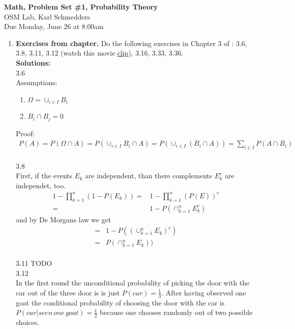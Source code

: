 \documentclass[letterpaper,12pt]{article}
\theoremstyle{definition}
\begin{document}
\begin{flushleft}
   \textbf{\large{Math, Problem Set \#1, Probability Theory}} \\[5pt]
   OSM Lab, Karl Schmedders \\[5pt]
   Due Monday, June 26 at 8:00am
\end{flushleft}

\vspace{5mm}

\begin{enumerate}
	\item {\bf Exercises from chapter.} Do the following exercises in Chapter 3 of \citet{HJ17}: 3.6, 3.8, 3.11, 3.12 (watch this movie \href{https://www.youtube.com/watch?v=Zr_xWfThjJ0}{clip}), 3.16, 3.33, 3.36. \\
	
	\textbf{Solutions:}\\
	3.6\\
 Assumptions: 
\begin{enumerate}
\item  $\Omega = \cup_{i\in I} B_i$ 
\item $B_i\cap B_j = 0$
\end{enumerate}  
Proof: 
\begin{align*}
P(A) =  P(\Omega \cap A) = P(\cup_{i\in I} B_i \cap A)
 = P(\cup_{i \in I} (B_i \cap A)) = \sum_{i \in I} P(A \cap B_i)
\end{align*} \\
3.8 \\ 
First, if the events $E_k$ are independent, than there complements $E_k^c$ are independet, too.
\begin{align*}
1-\prod_{k=1}^{n}(1 - P(E_k)) =& 1 - \prod_{k=1}^{n}\left( P(E) \right)^c \\
=& 1 -P(\cap^n_{k=1} E^c_k) 
\end{align*}
and by De Morgans law we get
\begin{align*}
=& 1 - P((\cup^n_{k=1} E_k)^c) \\
=& P(\cap^n_{k=1} E_k)) 
\end{align*} \\
3.11 TODO\\
3.12 \\
In the first round the unconditional  probability of picking the door with the car out of the three door is is just $P(car) = \frac{1}{3}$. After having observed one goat the conditional probability of choosing the door with the car is $P(car|seen\, one\, goat) = \frac{1}{2}$ because one chooses randomly out of two possible choices.\\

\end{enumerate}
\end{document}
